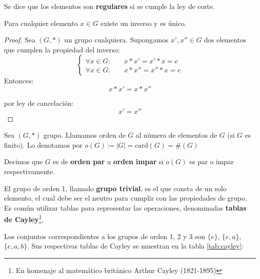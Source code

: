 Se dice que los elementos son \textbf{regulares} si se cumple la ley de corte.

\begin{proposition}
	Para cualquier elemento $x \in G$ existe un inverso y es único.
	
	\begin{proof}
		Sea $(G, *)$ un grupo cualquiera. Supongamos $x', x'' \in G$ dos elementos que cumplen la propiedad del inverso:
		\[ \begin{cases}
			\forall x \in G:& \quad x*x' = x'*x = e\\
			\forall x \in G:& \quad x*x'' = x''*x = e
		\end{cases} \]
		Entonces:
		\[ x * x' = x * x'' \]
		
		por ley de cancelación: \[ x' = x'' \]
	\end{proof}
\end{proposition}

\begin{fmd-definition}
	Sea $(G, *)$ grupo. Llamamos orden de $G$ al número de elementos de $G$ (si $G$ es finito). Lo denotamos por $o(G) \coloneqq |G| = \mbox{card} (G) = \# (G)$
\end{fmd-definition}

Decimos que $G$ es de \textbf{orden par} u \textbf{orden impar} si $o(G)$ es par o impar respectivamente.

El grupo de orden 1, llamado \textbf{grupo trivial}, es el que consta de un solo elemento, el cual debe ser el neutro para cumplir con las propiedades de grupo. Es común utilizar tablas para representar las operaciones, denominadas \textbf{tablas de Cayley}\footnote{En homenaje al matemático británico Arthur Cayley (1821-1895)}.

Los conjuntos correspondientes a los grupos de orden 1, 2 y 3 son $\{ e \}$, $\{ e, a \}$, $\{e, a, b\}$. Sus respectivas tablas de Cayley se muestran en la tabla \ref{tab:cayley}:

